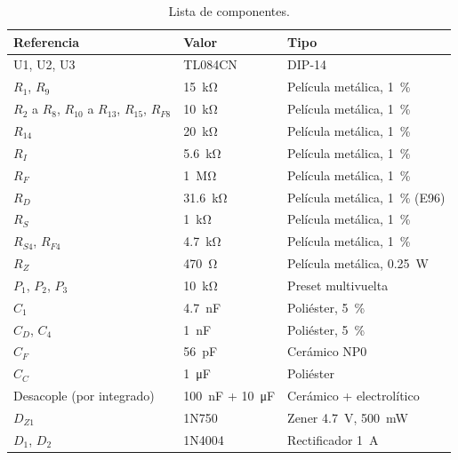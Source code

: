 \begin{table}[!htb]
\centering
\caption{Lista de componentes.}
\label{tab:bom}
\footnotesize
\setlength{\tabcolsep}{3pt}
\begin{tabular}{@{}>{\raggedright}p{2.5cm}l>{\raggedright\arraybackslash}p{3.2cm}@{}}
\toprule
\textbf{Referencia} & \textbf{Valor} & \textbf{Tipo} \\
\midrule
U1, U2, U3 & TL084CN & DIP-14 \\
$R_1$, $R_9$ & \SI{15}{\kilo\ohm} & Película metálica, \SI{1}{\percent} \\
$R_2$ a $R_8$, $R_{10}$ a $R_{13}$, $R_{15}$, $R_{F8}$ & \SI{10}{\kilo\ohm} & Película metálica, \SI{1}{\percent} \\
$R_{14}$ & \SI{20}{\kilo\ohm} & Película metálica, \SI{1}{\percent} \\
$R_I$ & \SI{5,6}{\kilo\ohm} & Película metálica, \SI{1}{\percent} \\
$R_F$ & \SI{1}{\mega\ohm} & Película metálica, \SI{1}{\percent} \\
$R_D$ & \SI{31,6}{\kilo\ohm} & Película metálica, \SI{1}{\percent} (E96) \\
$R_S$ & \SI{1}{\kilo\ohm} & Película metálica, \SI{1}{\percent} \\
$R_{S4}$, $R_{F4}$ & \SI{4,7}{\kilo\ohm} & Película metálica, \SI{1}{\percent} \\
$R_Z$ & \SI{470}{\ohm} & Película metálica, \SI{0,25}{\watt} \\
$P_1$, $P_2$, $P_3$ & \SI{10}{\kilo\ohm} & Preset multivuelta \\
$C_1$ & \SI{4,7}{\nano\farad} & Poliéster, \SI{5}{\percent} \\
$C_D$, $C_4$ & \SI{1}{\nano\farad} & Poliéster, \SI{5}{\percent} \\
$C_F$ & \SI{56}{\pico\farad} & Cerámico NP0 \\
$C_C$ & \SI{1}{\micro\farad} & Poliéster \\
Desacople (por integrado) & \SI{100}{\nano\farad} + \SI{10}{\micro\farad} & Cerámico + electrolítico \\
$D_{Z1}$ & 1N750 & Zener \SI{4,7}{\volt}, \SI{500}{\milli\watt} \\
$D_1$, $D_2$ & 1N4004 & Rectificador \SI{1}{\ampere} \\
\bottomrule
\end{tabular}
\end{table}

